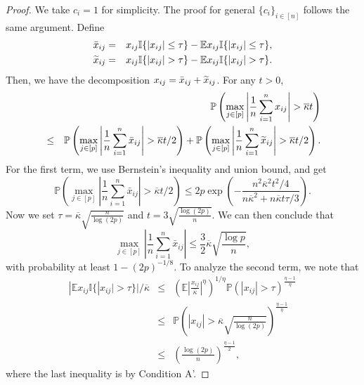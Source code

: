 \begin{proof}
We take $c_i=1$ for simplicity. The proof for general $\{c_i\}_{i\in[n]}$ follows the same argument. Define
\begin{eqnarray*}
\bar{x}_{ij} &=& x_{ij}\mathbb{I}\{|x_{ij}|\leq\tau\}-\mathbb{E}x_{ij}\mathbb{I}\{|x_{ij}|\leq\tau\}, \\
\wt{x}_{ij} &=& x_{ij}\mathbb{I}\{|x_{ij}|>\tau\}-\mathbb{E}x_{ij}\mathbb{I}\{|x_{ij}|>\tau\}.
\end{eqnarray*}
Then, we have the decomposition $x_{ij}=\bar{x}_{ij}+\widetilde{x}_{ij}$. For any $t>0$,
\begin{eqnarray*}
&& \mathbb{P}\left(\max_{j\in[p]}\left|\frac{1}{n}\sum_{i=1}^nx_{ij}\right|>\overline{\kappa} t\right) \\
&\leq& \mathbb{P}\left(\max_{j\in[p]}\left|\frac{1}{n}\sum_{i=1}^n\bar{x}_{ij}\right|>\overline{\kappa} t/2\right) + \mathbb{P}\left(\max_{j\in[p]}\left|\frac{1}{n}\sum_{i=1}^n\wt{x}_{ij}\right|>\overline{\kappa} t/2\right).
\end{eqnarray*}
For the first term, we use Bernstein's inequality and union bound, and get
\begin{equation}
\mathbb{P}\left(\max_{j\in[p]}\left|\frac{1}{n}\sum_{i=1}^n\bar{x}_{ij}\right|>\overline{\kappa} t/2\right)\leq 2p\exp\left(-\frac{n^2\overline{\kappa}^2t^2/4}{n\overline{\kappa}^2+n\overline{\kappa} t\tau/3}\right). \label{eq:ht-bern}
\end{equation}
Now we set $\tau=\overline{\kappa}\sqrt{\frac{n}{\log(2p)}}$ and $t=3\sqrt{\frac{\log(2p)}{n}}$. We can then conclude that
\begin{equation}
\max_{j\in[p]}\left|\frac{1}{n}\sum_{i=1}^n\bar{x}_{ij}\right|\leq \frac{3}{2}\overline{\kappa}\sqrt{\frac{\log p}{n}}, \label{eq:ht-01}
\end{equation}
with probability at least $1-(2p)^{-1/8}$. To analyze the second term, we note that
\begin{eqnarray}
\nonumber |\mathbb{E}x_{ij}\mathbb{I}\{|x_{ij}|>\tau\}|/\overline{\kappa} &\leq& \left(\mathbb{E}\left|\frac{x_{ij}}{\overline{\kappa}}\right|^{\eta}\right)^{1/\eta} \mathbb{P}\left(|x_{ij}|>\tau\right)^{\frac{\eta-1}{\eta}} \\
\nonumber &\leq&  \mathbb{P}\left(|x_{ij}|>\overline{\kappa}\sqrt{\frac{n}{\log(2p)}}\right)^{\frac{\eta-1}{\eta}} \\
\label{eq:holder-moment} &\leq& \left(\frac{\log (2p)}{n}\right)^{\frac{\eta-1}{2}},
\end{eqnarray}
where the last inequality is by Condition A'.

\end{proof}
